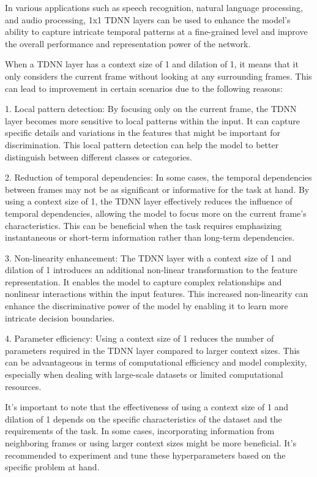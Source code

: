 \documentclass[a4paper]{article}
\begin{document}
In various applications such as speech recognition, natural language processing, and audio processing, 1x1 TDNN layers can be used to enhance the model's ability to capture intricate temporal patterns at a fine-grained level and improve the overall performance and representation power of the network.

When a TDNN layer has a context size of 1 and dilation of 1, it means that it only considers the current frame without looking at any surrounding frames. This can lead to improvement in certain scenarios due to the following reasons:

1. Local pattern detection: By focusing only on the current frame, the TDNN layer becomes more sensitive to local patterns within the input. It can capture specific details and variations in the features that might be important for discrimination. This local pattern detection can help the model to better distinguish between different classes or categories.

2. Reduction of temporal dependencies: In some cases, the temporal dependencies between frames may not be as significant or informative for the task at hand. By using a context size of 1, the TDNN layer effectively reduces the influence of temporal dependencies, allowing the model to focus more on the current frame's characteristics. This can be beneficial when the task requires emphasizing instantaneous or short-term information rather than long-term dependencies.

3. Non-linearity enhancement: The TDNN layer with a context size of 1 and dilation of 1 introduces an additional non-linear transformation to the feature representation. It enables the model to capture complex relationships and nonlinear interactions within the input features. This increased non-linearity can enhance the discriminative power of the model by enabling it to learn more intricate decision boundaries.

4. Parameter efficiency: Using a context size of 1 reduces the number of parameters required in the TDNN layer compared to larger context sizes. This can be advantageous in terms of computational efficiency and model complexity, especially when dealing with large-scale datasets or limited computational resources.

It's important to note that the effectiveness of using a context size of 1 and dilation of 1 depends on the specific characteristics of the dataset and the requirements of the task. In some cases, incorporating information from neighboring frames or using larger context sizes might be more beneficial. It's recommended to experiment and tune these hyperparameters based on the specific problem at hand.
\end{document}
